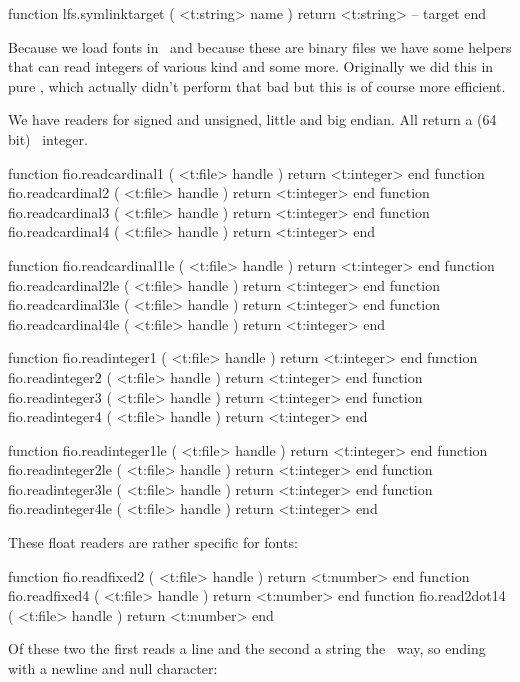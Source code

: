 \starttyping[option=LUA]
function lfs.symlinktarget ( <t:string> name )
    return <t:string> -- target
end
\stoptyping

\stopsubsection

\startsubsection[title=Reading from a file]

Because we load fonts in \LUA\ and because these are binary files we have some
helpers that can read integers of various kind and some more. Originally we did
this in pure \LUA, which actually didn't perform that bad but this is of course
more efficient.

We have readers for signed and unsigned, little and big endian. All return a (64
bit) \LUA\ integer.

\starttyping[option=LUA]
function fio.readcardinal1 ( <t:file> handle ) return <t:integer> end
function fio.readcardinal2 ( <t:file> handle ) return <t:integer> end
function fio.readcardinal3 ( <t:file> handle ) return <t:integer> end
function fio.readcardinal4 ( <t:file> handle ) return <t:integer> end

function fio.readcardinal1le ( <t:file> handle ) return <t:integer> end
function fio.readcardinal2le ( <t:file> handle ) return <t:integer> end
function fio.readcardinal3le ( <t:file> handle ) return <t:integer> end
function fio.readcardinal4le ( <t:file> handle ) return <t:integer> end

function fio.readinteger1 ( <t:file> handle ) return <t:integer> end
function fio.readinteger2 ( <t:file> handle ) return <t:integer> end
function fio.readinteger3 ( <t:file> handle ) return <t:integer> end
function fio.readinteger4 ( <t:file> handle ) return <t:integer> end

function fio.readinteger1le ( <t:file> handle ) return <t:integer> end
function fio.readinteger2le ( <t:file> handle ) return <t:integer> end
function fio.readinteger3le ( <t:file> handle ) return <t:integer> end
function fio.readinteger4le ( <t:file> handle ) return <t:integer> end
\stoptyping

These float readers are rather specific for fonts:

\starttyping[option=LUA]
function fio.readfixed2 ( <t:file> handle ) return <t:number>  end
function fio.readfixed4 ( <t:file> handle ) return <t:number>  end
function fio.read2dot14 ( <t:file> handle ) return <t:number>  end
\stoptyping

Of these two the first reads a line and the second a string the \CCODE\ way, so
ending with a newline and null character:

